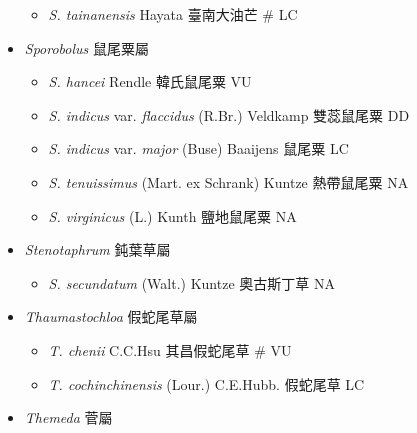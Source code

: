 \begin{itemize}
  \begin{itemize}
        \item[] \textit{S. tainanensis} Hayata  臺南大油芒  \# LC
  \end{itemize}
 \item[] \textit{Sporobolus} 鼠尾粟屬
                                
  \begin{itemize}
        \item[] \textit{S. hancei} Rendle  韓氏鼠尾粟   VU
        \item[] \textit{S. indicus} var. \textit{flaccidus} (R.Br.) Veldkamp  雙蕊鼠尾粟   DD
        \item[] \textit{S. indicus} var. \textit{major} (Buse) Baaijens  鼠尾粟   LC
        \item[] \textit{S. tenuissimus} (Mart. ex Schrank) Kuntze  熱帶鼠尾粟   NA
        \item[] \textit{S. virginicus} (L.) Kunth  鹽地鼠尾粟   NA
  \end{itemize}
 \item[] \textit{Stenotaphrum} 鈍葉草屬
                                
  \begin{itemize}
        \item[] \textit{S. secundatum} (Walt.) Kuntze  奧古斯丁草   NA
  \end{itemize}
 \item[] \textit{Thaumastochloa} 假蛇尾草屬
                                
  \begin{itemize}
        \item[] \textit{T. chenii} C.C.Hsu  其昌假蛇尾草  \# VU
        \item[] \textit{T. cochinchinensis} (Lour.) C.E.Hubb.  假蛇尾草   LC
  \end{itemize}
 \item[] \textit{Themeda} 菅屬
                                

\end{itemize}
